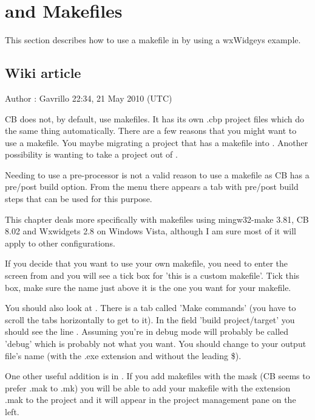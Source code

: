 \section{\codeblocks and Makefiles}\label{sec:cb_makefiles}
This section describes how to use a makefile in \codeblocks by using a wxWidgeys example.
\subsection{Wiki article}

Author : Gavrillo 22:34, 21 May 2010 (UTC)

CB does not, by default, use makefiles. It has its own .cbp project files which do the same thing automatically. There are a few reasons that you might want to use a makefile. You maybe migrating a project that has a makefile into \codeblocks. Another possibility is wanting to take a project out of \codeblocks.

Needing to use a pre-processor is not a valid reason to use a makefile as CB has a pre/post build option. From the menu  there appears a tab with pre/post build steps that can be used for this purpose.

This chapter deals more specifically with makefiles using mingw32-make 3.81, CB 8.02 and Wxwidgets 2.8 on Windows Vista, although I am sure most of it will apply to other configurations.

If you decide that you want to use your own makefile, you need to enter the screen from  and you will see a tick box for 'this is a custom makefile'. Tick this box, make sure the name just above it is the one you want for your makefile.

You should also look at . There is a tab called 'Make commands' (you have to scroll the tabs horizontally to get to it). In the field 'build project/target' you should see the line . Assuming you're in debug mode  will probably be called 'debug' which is probably not what you want. You should change  to your output file's name (with the .exe extension and without the leading \$).

One other useful addition is in . If you add makefiles with the mask  (CB seems to prefer .mak to .mk) you will be able to add your makefile with the extension .mak to the project and it will appear in the project management pane on the left.

